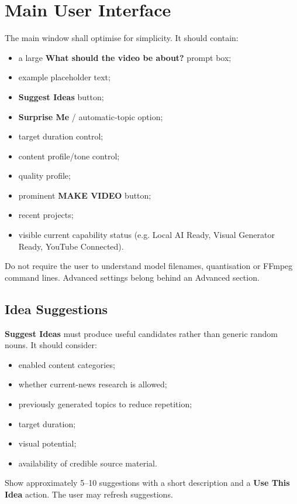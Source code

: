 \documentclass[10pt,journal,compsoc]{IEEEtran}
\begin{document}
\section{Main User Interface}

The main window shall optimise for simplicity. It should contain:
\begin{itemize}
    \item a large \textbf{What should the video be about?} prompt box;
    \item example placeholder text;
    \item \textbf{Suggest Ideas} button;
    \item \textbf{Surprise Me} / automatic-topic option;
    \item target duration control;
    \item content profile/tone control;
    \item quality profile;
    \item prominent \textbf{MAKE VIDEO} button;
    \item recent projects;
    \item visible current capability status (e.g. Local AI Ready, Visual Generator Ready, YouTube Connected).
\end{itemize}

Do not require the user to understand model filenames, quantisation or FFmpeg command lines. Advanced settings belong behind an Advanced section.

\subsection{Idea Suggestions}

\textbf{Suggest Ideas} must produce useful candidates rather than generic random nouns. It should consider:
\begin{itemize}
    \item enabled content categories;
    \item whether current-news research is allowed;
    \item previously generated topics to reduce repetition;
    \item target duration;
    \item visual potential;
    \item availability of credible source material.
\end{itemize}

Show approximately 5--10 suggestions with a short description and a \textbf{Use This Idea} action. The user may refresh suggestions.
\end{document}
